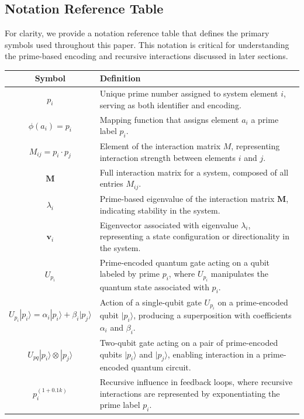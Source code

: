 \documentclass{article}
\begin{document}
\subsection{Notation Reference Table}

For clarity, we provide a notation reference table that defines the primary symbols used throughout this paper. This notation is critical for understanding the prime-based encoding and recursive interactions discussed in later sections.

\begin{table}[h]
\centering
\begin{tabular}{|c|p{10cm}|}
\hline
\textbf{Symbol} & \textbf{Definition} \\
\hline
\( p_i \) & Unique prime number assigned to system element \( i \), serving as both identifier and encoding. \\
\hline
\( \phi(a_i) = p_i \) & Mapping function that assigns element \( a_i \) a prime label \( p_i \). \\
\hline
\( M_{ij} = p_i \cdot p_j \) & Element of the interaction matrix \( M \), representing interaction strength between elements \( i \) and \( j \). \\
\hline
\( \mathbf{M} \) & Full interaction matrix for a system, composed of all entries \( M_{ij} \). \\
\hline
\( \lambda_i \) & Prime-based eigenvalue of the interaction matrix \( \mathbf{M} \), indicating stability in the system. \\
\hline
\( \mathbf{v}_i \) & Eigenvector associated with eigenvalue \( \lambda_i \), representing a state configuration or directionality in the system. \\
\hline
\( U_{p_i} \) & Prime-encoded quantum gate acting on a qubit labeled by prime \( p_i \), where \( U_{p_i} \) manipulates the quantum state associated with \( p_i \). \\
\hline
\( U_{p_i} | p_i \rangle = \alpha_i | p_i \rangle + \beta_i | p_j \rangle \) & Action of a single-qubit gate \( U_{p_i} \) on a prime-encoded qubit \( | p_i \rangle \), producing a superposition with coefficients \( \alpha_i \) and \( \beta_i \). \\
\hline
\( U_{pq} | p_i \rangle \otimes | p_j \rangle \) & Two-qubit gate acting on a pair of prime-encoded qubits \( | p_i \rangle \) and \( | p_j \rangle \), enabling interaction in a prime-encoded quantum circuit. \\
\hline
\( p_i^{(1 + 0.1k)} \) & Recursive influence in feedback loops, where recursive interactions are represented by exponentiating the prime label \( p_i \). \\

\end{tabular}
\end{table}
\end{document}
